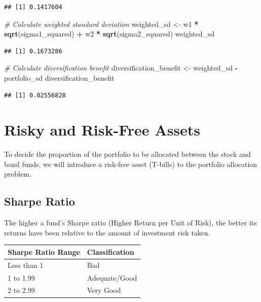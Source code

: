 \documentclass[
]{book}
\newenvironment{Shaded}{\begin{snugshade}}{\end{snugshade}}
\newcommand{\CommentTok}[1]{\textcolor[rgb]{0.56,0.35,0.01}{\textit{#1}}}
\newcommand{\FunctionTok}[1]{\textcolor[rgb]{0.13,0.29,0.53}{\textbf{#1}}}
\newcommand{\NormalTok}[1]{#1}
\newcommand{\OtherTok}[1]{\textcolor[rgb]{0.56,0.35,0.01}{#1}}
\newcommand{\SpecialCharTok}[1]{\textcolor[rgb]{0.81,0.36,0.00}{\textbf{#1}}}
\begin{document}
\begin{verbatim}
## [1] 0.1417604
\end{verbatim}

\begin{Shaded}
\begin{Highlighting}[]
\CommentTok{\# Calculate weighted standard deviation}
\NormalTok{weighted\_sd }\OtherTok{\textless{}{-}}\NormalTok{ w1 }\SpecialCharTok{*} \FunctionTok{sqrt}\NormalTok{(sigma1\_squared) }\SpecialCharTok{+}\NormalTok{ w2 }\SpecialCharTok{*} \FunctionTok{sqrt}\NormalTok{(sigma2\_squared)}
\NormalTok{weighted\_sd}
\end{Highlighting}
\end{Shaded}

\begin{verbatim}
## [1] 0.1673286
\end{verbatim}

\begin{Shaded}
\begin{Highlighting}[]
\CommentTok{\# Calculate diversification benefit}
\NormalTok{diversification\_benefit }\OtherTok{\textless{}{-}}\NormalTok{ weighted\_sd }\SpecialCharTok{{-}}\NormalTok{ portfolio\_sd}
\NormalTok{diversification\_benefit}
\end{Highlighting}
\end{Shaded}

\begin{verbatim}
## [1] 0.02556828
\end{verbatim}

\hypertarget{risky-and-risk-free-assets}{%
\section{Risky and Risk-Free Assets}\label{risky-and-risk-free-assets}}

To decide the proportion of the portfolio to be allocated between the stock and bond funds, we will introduce a risk-free asset (T-bills) to the portfolio allocation problem.

\hypertarget{sharpe-ratio}{%
\subsection{Sharpe Ratio}\label{sharpe-ratio}}

The higher a fund's Sharpe ratio (Higher Return per Unit of Risk), the better its returns have been relative to the amount of investment risk taken.

\begin{longtable}[]{@{}ll@{}}
\toprule\noalign{}
Sharpe Ratio Range & Classification \\
\midrule\noalign{}
\endhead
\bottomrule\noalign{}
\endlastfoot
Less than 1 & Bad \\
1 to 1.99 & Adequate/Good \\
2 to 2.99 & Very Good \\
\end{longtable}
\end{document}
